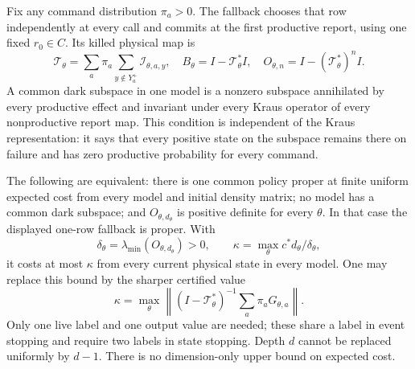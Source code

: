 Fix any command distribution $\pi_a>0$. The fallback chooses that row independently at every call and commits at the first productive report, using one fixed $r_0\in C$. Its killed physical map is
\[
 \mathcal T_\theta=\sum_a\pi_a\sum_{y\notin Y_a^+}\mathcal I_{\theta,a,y},
 \quad B_\theta=I-\mathcal T_\theta^*I,
 \quad O_{\theta,n}=I-(\mathcal T_\theta^*)^nI.
\]
A common dark subspace in one model is a nonzero subspace annihilated by every productive effect and invariant under every Kraus operator of every nonproductive report map. This condition is independent of the Kraus representation: it says that every positive state on the subspace remains there on failure and has zero productive probability for every command.

\begin{theorem}\label{thm:primitive-fallback}
The following are equivalent: there is one common policy proper at finite uniform expected cost from every model and initial density matrix; no model has a common dark subspace; and $O_{\theta,d_\theta}$ is positive definite for every $\theta$. In that case the displayed one-row fallback is proper. With
\[
 \delta_\theta=\lambda_{\min}(O_{\theta,d_\theta})>0,
 \qquad \kappa=\max_\theta c^*d_\theta/\delta_\theta,
\]
it costs at most $\kappa$ from every current physical state in every model. One may replace this bound by the sharper certified value
\[
 \kappa=\max_\theta\left\|(I-\mathcal T_\theta^*)^{-1}
                  \sum_a\pi_aG_{\theta,a}\right\|.
\]
Only one live label and one output value are needed; these share a label in event stopping and require two labels in state stopping. Depth $d$ cannot be replaced uniformly by $d-1$. There is no dimension-only upper bound on expected cost.
\end{theorem}
